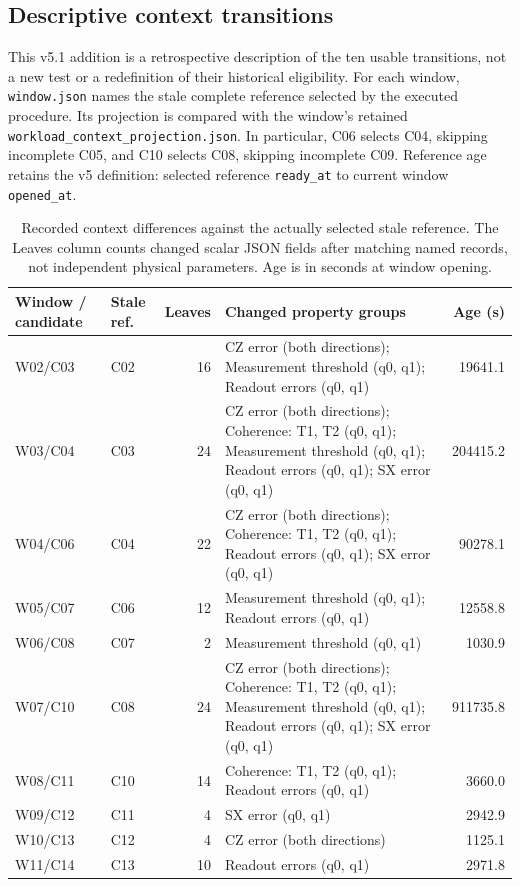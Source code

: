\documentclass[11pt,a4paper]{article}
\begin{document}
\subsection{Descriptive context transitions}
This v5.1 addition is a retrospective description of the ten usable transitions, not a new test or a redefinition of their historical eligibility. For each window, \texttt{window.json} names the stale complete reference selected by the executed procedure. Its projection is compared with the window's retained \texttt{workload\_context\_projection.json}. In particular, C06 selects C04, skipping incomplete C05, and C10 selects C08, skipping incomplete C09. Reference age retains the v5 definition: selected reference \texttt{ready\_at} to current window \texttt{opened\_at}.

\begin{table}[htbp]\centering\footnotesize
\begin{tabularx}{\linewidth}{@{}llrYr@{}}\toprule
Window / candidate & Stale ref. & Leaves & Changed property groups & Age (s)\\\midrule
W02/C03 & C02 & 16 & CZ error (both directions); Measurement threshold (q0, q1); Readout errors (q0, q1) & 19641.1\\
W03/C04 & C03 & 24 & CZ error (both directions); Coherence: T1, T2 (q0, q1); Measurement threshold (q0, q1); Readout errors (q0, q1); SX error (q0, q1) & 204415.2\\
W04/C06 & C04 & 22 & CZ error (both directions); Coherence: T1, T2 (q0, q1); Readout errors (q0, q1); SX error (q0, q1) & 90278.1\\
W05/C07 & C06 & 12 & Measurement threshold (q0, q1); Readout errors (q0, q1) & 12558.8\\
W06/C08 & C07 & 2 & Measurement threshold (q0, q1) & 1030.9\\
W07/C10 & C08 & 24 & CZ error (both directions); Coherence: T1, T2 (q0, q1); Measurement threshold (q0, q1); Readout errors (q0, q1); SX error (q0, q1) & 911735.8\\
W08/C11 & C10 & 14 & Coherence: T1, T2 (q0, q1); Readout errors (q0, q1) & 3660.0\\
W09/C12 & C11 & 4 & SX error (q0, q1) & 2942.9\\
W10/C13 & C12 & 4 & CZ error (both directions) & 1125.1\\
W11/C14 & C13 & 10 & Readout errors (q0, q1) & 2971.8\\
\bottomrule
\end{tabularx}
{}
\caption{Recorded context differences against the actually selected stale reference. The Leaves column counts changed scalar JSON fields after matching named records, not independent physical parameters. Age is in seconds at window opening.}\label{tab:contextchanges}
\end{table}
\end{document}
